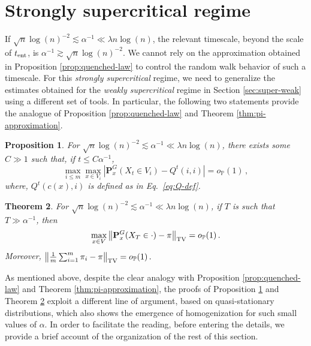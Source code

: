 \documentclass[11pt,oneside]{amsart}
\numberwithin{equation}{section}  %
\theoremstyle{plain}
\newtheorem{theorem}{Theorem}
\newtheorem{proposition}[theorem]{Proposition}
\newcommand{\p}{\mathbb{P}}
\newcommand{\op}{o_{\p}}
\newcommand{\tent}{t_{\textup{ent}}}
\newcommand{\quenchG}{\mathbf{P}^G}
\newcommand{\semi}{{Q}}
\begin{document}
\section{Strongly supercritical regime}\label{sec:super-strong}

If $ \sqrt{n}\log(n)^{-2}\lesssim\alpha^{-1}\ll \lambda n\log(n)$, the relevant timescale, beyond the scale of $\tent$, is $\alpha^{-1}  \gtrsim  \sqrt{n}\log(n)^{-2}$. We cannot rely on the approximation obtained in Proposition \ref{prop:quenched-law} to control the random walk behavior of such a timescale.
For this \emph{strongly supercritical} regime, we need to generalize the estimates obtained for the \emph{weakly supercritical} regime in Section \ref{sec:super-weak} using a different set of tools. In particular, the following two statements provide the analogue of Proposition \ref{prop:quenched-law} and Theorem \ref{thm:pi-approximation}.

\begin{proposition}\label{prop:quenched-law-new}	For $\sqrt{n}\log(n)^{-2} \lesssim  \alpha^{-1}\ll \lambda n\log(n)$, there exists some $C\gg 1$ such that, if $t\le C\alpha^{-1}$, 
	\begin{equation}\label{eq:part-new-gen}
		\max_{i \le m}\max_{x \in V_i}\left|\quenchG_x(X_t\in V_i)-\semi^t(i,i)\right|=\op(1)\,,
	\end{equation}
    where, $\semi^t(c(x),i)$ is defined as in Eq.~\eqref{eq:Q-def}.
\end{proposition}
\begin{theorem}\label{thm:pi-approximation-new}
For $\sqrt{n}{\log(n)^{-2}}  \lesssim  \alpha^{-1} \ll \lambda n\log(n)$, if $T$ is such that $T\gg \alpha^{-1}$, then
	\begin{equation}\label{eq:pi-approx-1}
		\max_{x\in V}\left\|\quenchG_x(X_{T}\in\cdot)-\pi\right\|_{\rm TV}=\op(1)\,.
	\end{equation}
	Moreover, $\left\|\frac1m\sum_{i=1}^m{\pi_i}-\pi\right\|_{\rm TV}=\op(1)\,.$
    \end{theorem}
    
	 
As mentioned above, despite the clear analogy with Proposition \ref{prop:quenched-law} and Theorem \ref{thm:pi-approximation}, the proofs of Proposition \ref{prop:quenched-law-new} and Theorem \ref{thm:pi-approximation-new} exploit a different line of argument, based on quasi-stationary distributions, which also shows the emergence of homogenization for such small values of $\alpha$. In order to facilitate the reading, before entering the details, we provide a brief account of the organization of the rest of this section.
\end{document}
